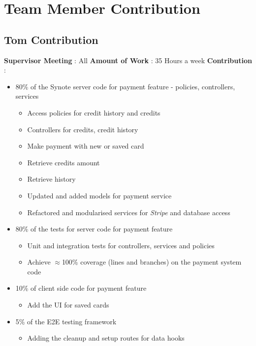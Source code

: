 \chapter{Team Member Contribution}
\label{appendix:team-member-contribution}

\section{Tom Contribution}
\textbf{Supervisor Meeting} : All
\newline
\textbf{Amount of Work} : 35 Hours a week
\newline
\textbf{Contribution} :
\begin{itemize}
	\item 80\% of the Synote server code for payment feature - policies, controllers, services
		\begin{itemize}
			\item Access policies for credit history and credits
			\item Controllers for credits, credit history
			\item Make payment with new or saved card
			\item Retrieve credits amount
			\item Retrieve history
			\item Updated and added models for payment service
			\item Refactored and modularised services for \textit{Stripe} and database access
		\end{itemize}
	\item 80\% of the tests for server code for payment feature
		\begin{itemize}
			\item Unit and integration tests for controllers, services and policies
			\item Achieve $\approx$100\% coverage (lines and branches) on the payment system code
		\end{itemize}
	\item 10\% of client side code for payment feature
		\begin{itemize}
			\item Add the UI for saved cards
		\end{itemize}
	\item 5\% of the E2E testing framework
		\begin{itemize}
			\item Adding the cleanup and setup routes for data hooks
		\end{itemize}

\end{itemize}
